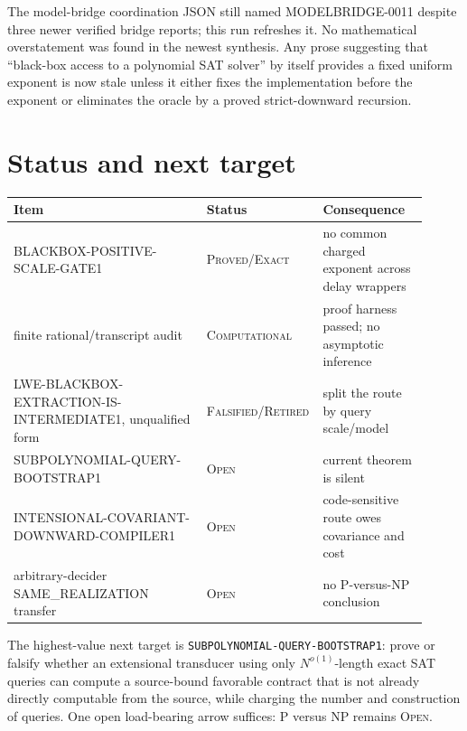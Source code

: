 \documentclass[11pt]{article}
\newcommand{\status}[1]{\textsc{#1}}
\begin{document}
The model-bridge coordination JSON still named MODELBRIDGE-0011 despite three
newer verified bridge reports; this run refreshes it.  No mathematical
overstatement was found in the newest synthesis.  Any prose suggesting that
``black-box access to a polynomial SAT solver'' by itself provides a fixed
uniform exponent is now stale unless it either fixes the implementation
before the exponent or eliminates the oracle by a proved strict-downward
recursion.

\section{Status and next target}

\begin{center}
\begin{tabular}{@{}p{0.46\linewidth}p{0.20\linewidth}p{0.25\linewidth}@{}}
\toprule
Item & Status & Consequence\\ \midrule
BLACKBOX-POSITIVE-SCALE-GATE1 & \status{Proved/Exact} & no common charged exponent across delay wrappers\\
finite rational/transcript audit & \status{Computational} & proof harness passed; no asymptotic inference\\
LWE-BLACKBOX-EXTRACTION-IS-INTERMEDIATE1, unqualified form & \status{Falsified/Retired} & split the route by query scale/model\\
SUBPOLYNOMIAL-QUERY-BOOTSTRAP1 & \status{Open} & current theorem is silent\\
INTENSIONAL-COVARIANT-DOWNWARD-COMPILER1 & \status{Open} & code-sensitive route owes covariance and cost\\
arbitrary-decider SAME\_REALIZATION transfer & \status{Open} & no P-versus-NP conclusion\\
\bottomrule
\end{tabular}
\end{center}

The highest-value next target is \texttt{SUBPOLYNOMIAL-QUERY-BOOTSTRAP1}:
prove or falsify whether an extensional transducer using only
$N^{o(1)}$-length exact SAT queries can compute a source-bound favorable
contract that is not already directly computable from the source, while
charging the number and construction of queries.  One open load-bearing arrow
suffices: P versus NP remains \status{Open}.
\end{document}
